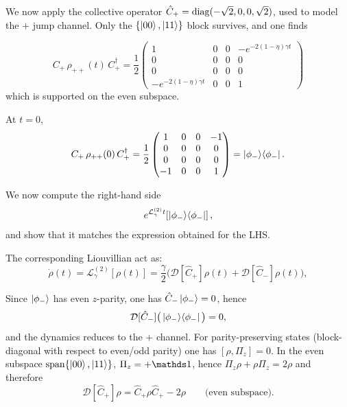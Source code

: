 We now apply the collective operator $\hat C_+=\mathrm{diag}(-\sqrt{2},0,0,\sqrt{2})$, used to model the $+$ jump channel. Only the $\{\ket{00},\ket{11}\}$ block survives, and one finds

\begin{equation}
	C_+\,\rho_{++}(t)\,C_+^\dagger
	=
	\frac{1}{2}
	\begin{pmatrix}
		1 & 0 & 0 & -e^{-2(1-\eta)\gamma t}\\
		0 & 0 & 0 & 0\\
		0 & 0 & 0 & 0\\
		-e^{-2(1-\eta)\gamma t} & 0 & 0 & 1
	\end{pmatrix}
	\label{eq:LHS_result_Cplus}
\end{equation}
which is supported on the even subspace.

At $t=0$,
\begin{equation}
	C_+\,\rho_{++}(0)\,C_+^\dagger
	=
	\frac{1}{2}
	\begin{pmatrix}
		1 & 0 & 0 & -1\\
		0 & 0 & 0 & 0\\
		0 & 0 & 0 & 0\\
		-1 & 0 & 0 & 1
	\end{pmatrix}
	=
	\ket{\phi_-}\!\bra{\phi_-}.
\end{equation}

We now compute the right-hand side
\begin{equation}
	e^{\mathcal{L}^{(2)}_{\gamma}t}\!\left[\ket{\phi_-}\!\bra{\phi_-}\right],
\end{equation}
and show that it matches the expression obtained for the LHS.

The corresponding Liouvillian act as:
\begin{equation}
	\dot{\rho}(t)=\mathcal{L}^{(2)}_{\gamma}[\rho(t)]
	=\frac{\gamma}{2}\Big(\mathcal{D}[\hat C_+]\rho(t)+\mathcal{D}[\hat C_-]\rho(t)\Big),
	\label{eq:Liouv_collective_RHS}
\end{equation}

Since $\ket{\phi_-}$ has even $z$-parity, one has $\hat C_- \ket{\phi_-}=0$, hence
\begin{equation}
	\mathcal{D}[\hat C_-]\big(\ket{\phi_-}\!\bra{\phi_-}\big)=0,
\end{equation}
and the dynamics reduces to the $+$ channel.
For parity-preserving states (block-diagonal with respect to even/odd parity) one has
$[\rho,\Pi_z]=0$. In the even subspace $\mathrm{span}\{\ket{00},\ket{11}\}$, $\Pi_z=+\id$,
hence $\Pi_z\rho+\rho\Pi_z=2\rho$ and therefore
\begin{equation}
	\mathcal{D}[\hat C_+]\rho
	=\hat C_+ \rho \hat C_+-2\rho
	\qquad \text{(even subspace)}.
	\label{eq:Dplus_even}
\end{equation}


